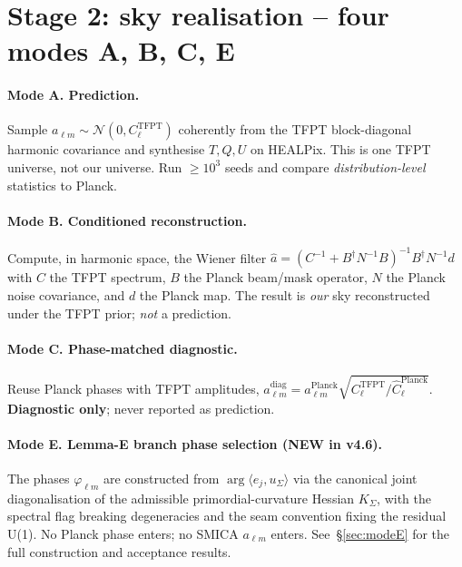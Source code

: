 \section{Stage 2: sky realisation -- four modes A, B, C, E}
\label{sec:stage2}

\paragraph{Mode A. Prediction.} Sample
\(a_{\ell m}\sim\mathcal N(0,C_\ell^{\mathrm{TFPT}})\) coherently from
the TFPT block-diagonal harmonic covariance and synthesise
\(T,Q,U\) on HEALPix.  This is one TFPT universe, not our universe.
Run \(\geq 10^3\) seeds and compare \emph{distribution-level}
statistics to Planck.

\paragraph{Mode B. Conditioned reconstruction.} Compute, in harmonic
space, the Wiener filter
\(\hat a = (C^{-1}+B^\dagger N^{-1}B)^{-1} B^\dagger N^{-1} d\)
with \(C\) the TFPT spectrum, \(B\) the Planck beam/mask operator,
\(N\) the Planck noise covariance, and \(d\) the Planck map.  The
result is \emph{our} sky reconstructed under the TFPT prior;
\emph{not} a prediction.

\paragraph{Mode C. Phase-matched diagnostic.} Reuse Planck phases with
TFPT amplitudes,
\(a_{\ell m}^{\mathrm{diag}}=a_{\ell m}^{\mathrm{Planck}}
\sqrt{C_\ell^{\mathrm{TFPT}}/\widehat C_\ell^{\mathrm{Planck}}}\).
\textbf{Diagnostic only}; never reported as prediction.

\paragraph{Mode E. Lemma-E branch phase selection (NEW in v4.6).}
\label{sec:modeE_def}
The phases \(\varphi_{\ell m}\) are constructed from
\(\arg\langle e_j,u_\Sigma\rangle\) via the canonical joint
diagonalisation of the admissible primordial-curvature Hessian
\(K_\Sigma\), with the spectral flag breaking degeneracies and the
seam convention fixing the residual U(1).  No Planck phase enters; no
SMICA \(a_{\ell m}\) enters.  See~\S\ref{sec:modeE} for the full
construction and acceptance results.

